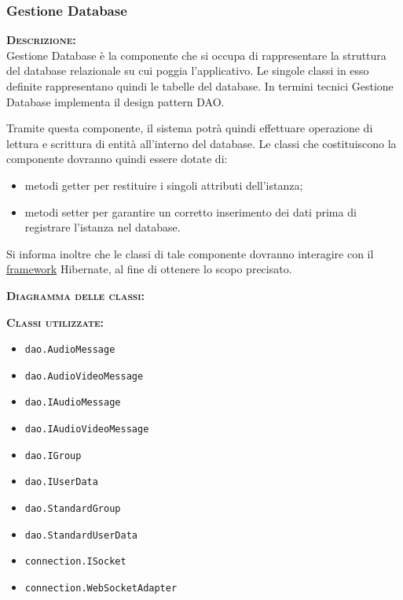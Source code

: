 \subsubsection{Gestione Database}
\begin{description}
\item{\scshape\bfseries Descrizione:}\\
Gestione Database è la componente che si occupa di rappresentare la struttura del database relazionale su cui poggia l'applicativo. Le singole classi in esso definite rappresentano quindi le tabelle del database. In termini tecnici Gestione Database implementa il design pattern DAO\@.

Tramite questa componente, il sistema potrà quindi effettuare operazione di lettura e scrittura di entità all'interno del database. Le classi che costituiscono la componente dovranno quindi essere dotate di:

\begin{itemize}
	\item metodi getter per restituire i singoli attributi dell'istanza;
	\item metodi setter per garantire un corretto inserimento dei dati prima di registrare l'istanza nel database.
\end{itemize}

Si informa inoltre che le classi di tale componente dovranno interagire con il \underline{framework} Hibernate, al fine di ottenere lo scopo precisato.

	\item{\scshape\bfseries Diagramma delle classi:}
	\item{\scshape\bfseries Classi utilizzate:}
\begin{itemize}
  \item \texttt{dao.AudioMessage}
  \item \texttt{dao.AudioVideoMessage}
  \item \texttt{dao.IAudioMessage}
  \item \texttt{dao.IAudioVideoMessage}
  \item \texttt{dao.IGroup}
  \item \texttt{dao.IUserData}
  \item \texttt{dao.StandardGroup}
  \item \texttt{dao.StandardUserData}
\end{itemize}
\end{description}

\begin{itemize}
	\item \texttt{connection.ISocket}
	\item \texttt{connection.WebSocketAdapter}
\end{itemize}

